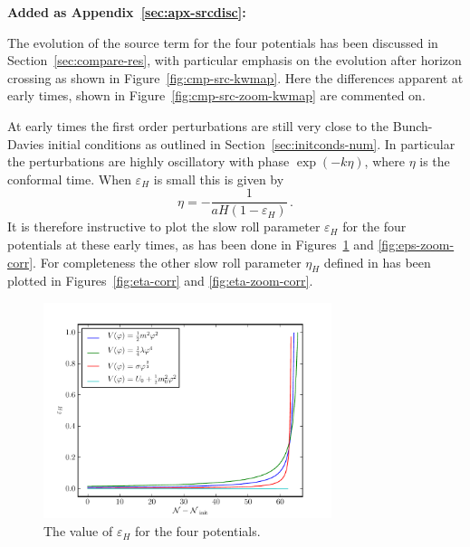 \textbf{Added as Appendix~\ref{sec:apx-srcdisc}:}

The evolution of the source term for the four potentials has been discussed in
Section~\ref{sec:compare-res}, with particular emphasis on the evolution after horizon crossing as
shown in Figure~\ref{fig:cmp-src-kwmap}. Here the differences apparent at early times, shown in
Figure~\ref{fig:cmp-src-zoom-kwmap} are commented on.

At early times the first order perturbations are still very close to the Bunch-Davies initial
conditions as outlined in Section~\ref{sec:initconds-num}. In particular the perturbations are
highly oscillatory with phase $\exp(-k\eta)$, where $\eta$ is the conformal time. When
$\varepsilon_H$ is small this is given by 
% 
\begin{equation}
 \eta = -\frac{1}{aH(1-\varepsilon_H)}\,.
\end{equation}
% 
It is therefore instructive to plot the slow roll parameter $\varepsilon_H$ for the four potentials
at these early times, as has been done in Figures~\ref{fig:eps-corr} and \ref{fig:eps-zoom-corr}.
For
completeness the other slow roll parameter $\eta_H$ defined in  has been
plotted in Figures~\ref{fig:eta-corr} and \ref{fig:eta-zoom-corr}. 

\begin{figure}
 \centering
 \includegraphics[width=0.75\textwidth]{numerical/graphs/epsilon_slowroll-large.pdf}
 \caption{The value of $\varepsilon_H$ for the four potentials.}
 \label{fig:eps-corr}
\end{figure}

